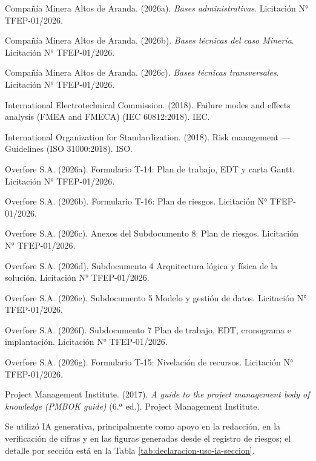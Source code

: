 \documentclass[subdoc]{../../comun/overfore}
\begin{document}
\begin{referencias}
\item Compañía Minera Altos de Aranda. (2026a). \emph{Bases administrativas}. Licitación N° TFEP-01/2026.
\item Compañía Minera Altos de Aranda. (2026b). \emph{Bases técnicas del caso Minería}. Licitación N° TFEP-01/2026.
\item Compañía Minera Altos de Aranda. (2026c). \emph{Bases técnicas transversales}. Licitación N° TFEP-01/2026.
\item International Electrotechnical Commission. (2018). Failure modes and effects analysis (FMEA and FMECA) (IEC 60812:2018). IEC.
\item International Organization for Standardization. (2018). Risk management — Guidelines (ISO 31000:2018). ISO.
\item Overfore S.A. (2026a). Formulario T-14: Plan de trabajo, EDT y carta Gantt. Licitación N° TFEP-01/2026.
\item Overfore S.A. (2026b). Formulario T-16: Plan de riesgos. Licitación N° TFEP-01/2026.
\item Overfore S.A. (2026c). Anexos del Subdocumento 8: Plan de riesgos. Licitación N° TFEP-01/2026.
\item Overfore S.A. (2026d). Subdocumento 4 Arquitectura lógica y física de la solución. Licitación N° TFEP-01/2026.
\item Overfore S.A. (2026e). Subdocumento 5 Modelo y gestión de datos. Licitación N° TFEP-01/2026.
\item Overfore S.A. (2026f). Subdocumento 7 Plan de trabajo, EDT, cronograma e implantación. Licitación N° TFEP-01/2026.
\item Overfore S.A. (2026g). Formulario T-15: Nivelación de recursos. Licitación N° TFEP-01/2026.
\item Project Management Institute. (2017). \emph{A guide to the project management body of knowledge (PMBOK guide)} (6.ª ed.). Project Management Institute.
\end{referencias}

Se utilizó IA generativa, principalmente como apoyo en la redacción, en la verificación de cifras y en las figuras generadas desde el registro de riesgos; el detalle por sección está en la Tabla \ref{tab:declaracion-uso-ia-seccion}.
\end{document}
